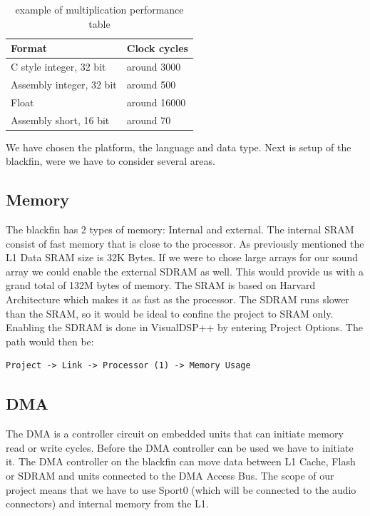 \begin{table}[hbtp]
	\centering
    \begin{tabular}{| p{4.5cm} | p{2.5cm} |}
    \hline
    Format                   & Clock cycles \\ \hline
    C style integer, 32 bit  & around 3000  \\ \hline
    Assembly integer, 32 bit & around 500   \\ \hline
    Float                    & around 16000 \\ \hline
    Assembly short, 16 bit   & around 70    \\ \hline
    \end{tabular}
    \caption{example of multiplication performance table}
    \label{tab:performance}
\end{table}

We have chosen the platform, the language and data type. Next is setup of the blackfin, were we have to consider several areas.

\subsection{Memory}
The blackfin has 2 types of memory: Internal and external. The internal SRAM consist of fast memory that is close to the processor.  As previously mentioned the L1 Data SRAM size is 32K Bytes. If we were to chose large arrays for our sound array we could enable the external SDRAM as well. This would provide us with a grand total of 132M bytes of memory. The SRAM is based on Harvard Architecture which makes it as fast as the processor. The SDRAM runs slower than the SRAM, so it would be ideal to confine the project to SRAM only. Enabling the SDRAM is done in VisualDSP++ by entering Project Options. The path would then be:
\begin{verbatim}
Project -> Link -> Processor (1) -> Memory Usage
\end{verbatim}

\subsection{DMA}
The DMA is a controller circuit on embedded units that can initiate memory read or write cycles. Before the DMA controller can be used we have to initiate it. The DMA controller on the blackfin can move data between L1 Cache, Flash or SDRAM and units connected to the DMA Access Bus. The scope of our project means that we have to use Sport0 (which will be connected to the audio connectors) and internal memory from the L1. \\

